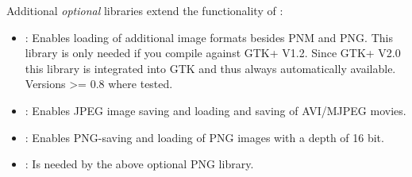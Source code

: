 Additional \emph{optional} libraries extend the functionality of
\icewing{}:
\begin{itemize}
\item {}: Enables loading of additional image
  formats besides PNM and PNG. This library is only needed if you
  compile against GTK+ V1.2. Since GTK+ V2.0 this library is
  integrated into GTK and thus always automatically
  available. Versions \textgreater= 0.8 where tested.
\item {}: Enables JPEG image saving and loading and
  saving of AVI/MJPEG movies.
\item {}: Enables PNG-saving and loading of PNG images
  with a depth of 16 bit.
\item {}: Is needed by the above optional PNG library.


\end{itemize}
